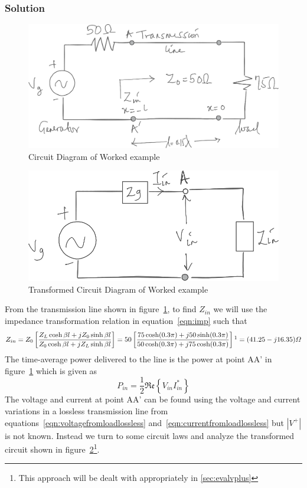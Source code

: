\begin{exmp}
\subsubsection*{Solution}
\begin{figure}[h]
\centering
\includegraphics[width=1\linewidth]{./graphics/power_problem_temp}
\caption{Circuit Diagram of Worked example}
\label{fig:powerproblem}
\end{figure}
\begin{figure}[h]
\centering
\includegraphics[width=.7\linewidth]{./graphics/power_problem2_temp}
\caption{Transformed Circuit Diagram of Worked example}
\label{fig:powerproblem2}
\end{figure}

From the transmission line shown in figure~\ref{fig:powerproblem}, to find $Z_{in}$ we will use the impedance transformation relation in equation~\eqref{eqn:imp} such that
\begin{dmath*}
Z_{in} = Z_0\left[\frac{Z_L\cosh\beta l + jZ_0\sinh\beta l}{Z_0\cosh\beta l + jZ_L\sinh\beta l} \right]
= 50\left[\frac{75\cosh(0.3\pi) + j50\sinh(0.3\pi)}{50\cosh(0.3\pi) + j75\cosh(0.3\pi)} \right]\footnotemark
= (41.25 - j16.35)\varOmega
\end{dmath*}
The time-average power delivered to the line is the power at point AA' in figure~\ref{fig:powerproblem} which is given as
\begin{dmath*}
P_{in} = \frac{1}{2}\mathfrak{Re}\left\lbrace V_{in}I_{in}^*\right\rbrace
\end{dmath*}
The voltage and current at point AA' can be found using the voltage and current variations in a lossless transmission line from equations~\eqref{eqn:voltagefromloadlossless} and~\eqref{eqn:currentfromloadlossless} but $|V^+|$ is not known. Instead we turn to some circuit laws and analyze the transformed circuit shown in figure~\ref{fig:powerproblem2}\footnote{This approach will be dealt with appropriately in \autoref{sec:evalvplus}}.


\end{exmp}

